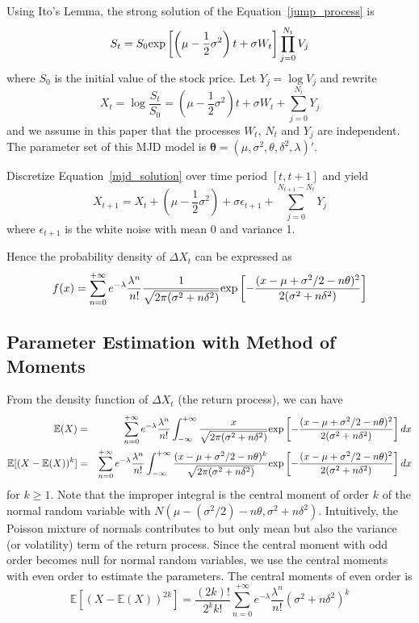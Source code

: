 \documentclass[11pt,reqno,final]{amsart}
\def\exp{\hbox{\rm exp}}
\begin{document}
Using Ito's Lemma, the strong solution of the Equation~\ref{jump_process} is
$$
S_t = S_0 \exp\left[\left( \mu - \frac{1}{2} \sigma^2 \right)t + \sigma W_t \right] \prod_{j=0}^{N_t} V_j
$$
where $S_0$ is the initial value of the stock price. Let $Y_j = \log V_j$ and rewrite
\begin{equation} \label{mjd_solution}
X_t = \log\frac{S_t}{S_0} = \left(\mu-\frac{1}{2} \sigma^2 \right)t + \sigma W_t + \sum_{j=0}^{N_t}Y_j
\end{equation}
and we assume in this paper that the processes $W_t$, $N_t$ and $Y_j$ are independent. The parameter set
of this MJD model is $\mathbf{\theta}=(\mu, \sigma^2, \theta, \delta^2, \lambda)'$.

Discretize Equation~\ref{mjd_solution} over time period $[t, t+1]$ and yield
$$
X_{t+1} = X_t + \left( \mu - \frac{1}{2}\sigma^2 \right) + \sigma \epsilon_{t+1} + \sum_{j=0}^{N_{t+1}-N_{t}}Y_j
$$
where $\epsilon_{t+1}$ is the white noise with mean 0 and variance 1.

Hence the probability density of $\Delta X_t$ can be expressed as
$$
f(x) = \sum_{n=0}^{+\infty} e^{-\lambda}\frac{\lambda^n}{n!} \frac{1}{\sqrt{2\pi(\sigma^2+n\delta^2)}} \exp\left[ -\frac{(x-\mu+\sigma^2/2 -n\theta)^2}{2(\sigma^2+n\delta^2)} \right]
$$

\subsection{Parameter Estimation with Method of Moments}
From the density function of $\Delta X_t$ (the return process), we can have
\begin{eqnarray*}
\mathbb{E}(X) &=& \sum_{n=0}^{+\infty} e^{-\lambda}\frac{\lambda^n}{n!} \int_{-\infty}^{+\infty} \frac{x}{\sqrt{2\pi(\sigma^2+n\delta^2)}} \exp\left[ -\frac{(x-\mu+\sigma^2/2 -n\theta)^2}{2(\sigma^2+n\delta^2)} \right] dx \\
\mathbb{E}[(X-\mathbb{E}(X))^k] &=& \sum_{n=0}^{+\infty} e^{-\lambda}\frac{\lambda^n}{n!} \int_{-\infty}^{+\infty} \frac{(x-\mu+\sigma^2/2 -n\theta)^k}{\sqrt{2\pi(\sigma^2+n\delta^2)}} \exp\left[ -\frac{(x-\mu+\sigma^2/2 -n\theta)^2}{2(\sigma^2+n\delta^2)} \right] dx \\
\end{eqnarray*}
for $k\geq 1$. Note that the improper integral is the central moment of order $k$ of the normal random variable with $N(\mu-(\sigma^2/2)-n\theta, \sigma^2+n\delta^2)$. Intuitively, the Poisson mixture of normals contributes to but only mean but also the variance (or volatility) term of the return process. Since the central moment with odd order becomes null for normal random variables, we use the central moments with even order to estimate the parameters. The central moments of even order is
$$
\mathbb{E}[(X-\mathbb{E}(X))^{2k}] = \frac{(2k)!}{2^k k!} \sum_{n=0}^{+\infty} e^{-\lambda}\frac{\lambda^n}{n!} (\sigma^2 + n\delta^2)^k
$$
\end{document}
